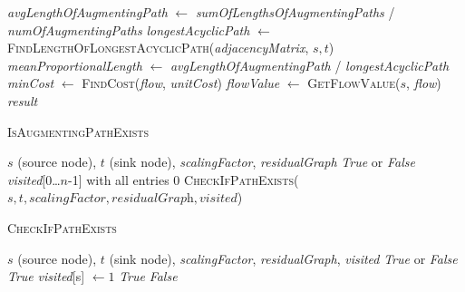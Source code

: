 \documentclass{article}
\begin{document}
\begin{algorithm}[H]
\begin{algorithmic}[1]
\State \textit{avgLengthOfAugmentingPath} $\gets$ \textit{sumOfLengthsOfAugmentingPaths} / \textit{numOfAugmentingPaths}
\State \textit{longestAcyclicPath} $\gets$ \textcolor{identifiercolor}{\textsc{FindLengthOfLongestAcyclicPath}}(\textit{adjacencyMatrix}, $s, t$)
\State \textit{meanProportionalLength} $\gets$ \textit{avgLengthOfAugmentingPath} / \textit{longestAcyclicPath}
\State \textit{minCost} $\gets$ \textcolor{identifiercolor}{\textsc{FindCost}}(\textit{flow}, \textit{unitCost})
\State \textit{flowValue} $\gets$ \textcolor{identifiercolor}{\textsc{GetFlowValue}}($s$, \textit{flow})
\State \Return \textit{result}
\end{algorithmic}
\end{algorithm}

\begin{algorithm}[H]
\caption{\textcolor{keywordcolor}{\textsc{IsAugmentingPathExists}}}
\begin{algorithmic}[1]
\State {} $s$ (source node), $t$ (sink node), \textit{scalingFactor}, \textit{residualGraph}
\State {} \textit{True} or \textit{False}
\State {} \textit{visited}[0…$n$-1] with all entries 0
\State \Return \textcolor{identifiercolor}{\textsc{CheckIfPathExists}}($s, t, \textit{scalingFactor}, \textit{residualGraph}, \textit{visited}$)
\end{algorithmic}
\end{algorithm}

\begin{algorithm}[H]
\caption{\textcolor{keywordcolor}{\textsc{CheckIfPathExists}}}
\begin{algorithmic}[1]
\State {} $s$ (source node), $t$ (sink node), \textit{scalingFactor}, \textit{residualGraph}, \textit{visited}
\State {} \textit{True} or \textit{False}
    \State \Return \textit{True}
\EndIf
\State \textit{visited}[s] $\gets 1$
            \State \Return \textit{True}
        \EndIf
    \EndIf
\EndFor
\State \Return \textit{False}
\end{algorithmic}
\end{algorithm}
\end{document}
